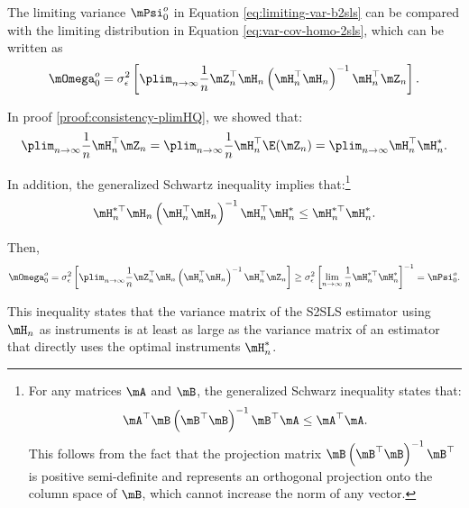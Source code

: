 \documentclass[english,12pt]{book}\usepackage[]{graphicx}\usepackage[]{xcolor}
\begin{document}
The limiting variance $\mPsi_0^o$ in Equation \eqref{eq:limiting-var-b2sls} can be compared with the limiting distribution in Equation \eqref{eq:var-cov-homo-2sls}, which can be written as
\begin{equation*}
\mOmega_0^o = \sigma_{\epsilon}^2\left[\plim_{n\to\infty}\frac{1}{n}\mZ^\top_n\mH_n\left(\mH_n^\top\mH_n\right)^{-1}\mH_n^\top\mZ_n\right].
\end{equation*}

In proof \ref{proof:consistency-plimHQ}, we showed that:
\begin{equation*}
\plim_{n\to\infty}\frac{1}{n}\mH_n^\top\mZ_n = \plim_{n\to\infty}\frac{1}{n}\mH_n^\top\E(\mZ_n)=\plim_{n\to\infty}\mH_n^\top\mH_n^*.
\end{equation*}

In addition, the generalized Schwartz inequality implies that:\footnote{For any matrices $\mA$ and $\mB$, the generalized Schwarz inequality states that:
\begin{equation*}
\mA^\top\mB\left(\mB^\top\mB\right)^{-1}\mB^\top\mA\leq \mA^\top\mA.
\end{equation*}
This follows from the fact that the projection matrix $\mB\left(\mB^\top\mB\right)^{-1}\mB^\top$ is positive semi-definite and represents an orthogonal projection onto the column space of $\mB$, which cannot increase the norm of any vector.
}
\begin{equation*}
\mH_n^{*\top}\mH_n\left(\mH_n^\top\mH_n\right)^{-1}\mH_n^\top\mH_n^{*}\leq \mH_n^{*\top}\mH_n^*.
\end{equation*}

Then,
\begin{equation*}
\mOmega_0^o =  \sigma_{\epsilon}^2\left[\plim_{n\to\infty}\frac{1}{n}\mZ^\top_n\mH_n\left(\mH_n^\top\mH_n\right)^{-1}\mH_n^\top\mZ_n\right] \geq \sigma_{\epsilon}^2\left[\lim_{n\to\infty} \frac{1}{n}\mH^{*\top}_n \mH_n^*\right]^{-1} = \mPsi_0^o.
\end{equation*}

This inequality states that the variance matrix of the S2SLS estimator using $\mH_n$ as instruments is at least as large as the variance matrix of an estimator that directly uses the optimal instruments $\mH_n^*$. 
\end{document}
